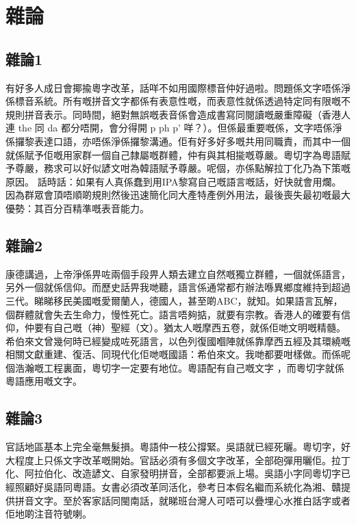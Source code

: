 \chapter{雜論}

\section{雜論1}
有好多人成日會揶揄粵字改革，話咩不如用國際標音仲好過啦。問題係文字唔係淨係標音系統。所有嘅拼音文字都係有表意性嘅，而表意性就係透過特定同有限嘅不規則拼音表示。同時間，絕對無誤嘅表音係會造成書寫同閱讀嘅嚴重障礙（香港人連 the 同 da 都分唔開，會分得開 p ph p’ 咩？）。但係最重要嘅係，文字唔係淨係攞黎表達口語，亦唔係淨係攞黎溝通。佢有好多好多嘅共用同職責，而其中一個就係賦予佢嘅用家群一個自己隸屬嘅群體，仲有與其相㨢嘅尊嚴。粵切字為粵語賦予尊嚴，務求可以好似諺文咁為韓語賦予尊嚴。呢個，亦係點解拉丁化乃為下策嘅原因。
話時話：如果有人真係蠢到用IPA黎寫自己嘅語言嘅話，好快就會用爛。因為群眾會頂唔順啲規則然後迅速簡化同大產特產例外用法，最後喪失最初嘅最大優勢：其百分百精準嘅表音能力。

\section{雜論2}
康德講過，上帝淨係畀咗兩個手段畀人類去建立自然嘅獨立群體，一個就係語言，另外一個就係信仰。而歷史話畀我哋聽，語言係通常都冇辦法喺異鄉度維持到超過三代。睇睇移民美國嘅愛爾蘭人，德國人，甚至啲ABC，就知。如果語言瓦解，個群體就會失去生命力，慢性死亡。語言唔夠掂，就要有宗教。香港人的確要有信仰，仲要有自己嘅（神）聖經（文）。猶太人嘅摩西五卷，就係佢哋文明嘅精髓。希伯來文曾幾何時已經變成咗死語言，以色列復國嗰陣就係靠摩西五經及其環繞嘅相關文獻重建、復活、同現代化佢哋嘅國語：希伯來文。我哋都要咁樣做。而係呢個浩瀚嘅工程裏面，粵切字一定要有地位。粵語配有自己嘅文字 ，而粵切字就係粵語應用嘅文字。

\section{雜論3}
官話地區基本上完全毫無髮損。粵語仲一枝公撐緊。吳語就已經死曬。粵切字，好大程度上只係文字改革嘅開始。官話必須有多個文字改革，全部砲彈用曬佢。拉丁化、阿拉伯化、改造諺文、自家發明拼音，全部都要派上場。吳語小字同粵切字已經照顧好吳語同粵語。女書必須改革同活化，參考日本假名繼而系統化為湘、贛提供拼音文字。至於客家話同閩南話，就睇班台灣人可唔可以疊埋心水推白話字或者佢地啲注音符號喇。

